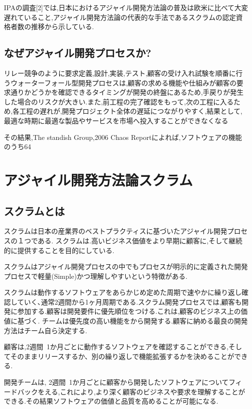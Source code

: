 \documentclass[paper]{jrsj}
\begin{document}
IPAの調査[2]では,日本におけるアジャイル開発方法論の普及は欧米に比べて大変遅れていること,アジャイル開発方法論の代表的な手法であるスクラムの認定資格者数の推移から示している.

\subsection{なぜアジャイル開発プロセスか?}
リレー競争のように要求定義,設計,実装,テスト,顧客の受け入れ試験を順番に行うウォーターフォール型開発プロセスは,顧客の求める機能や仕組みが顧客の要求通りかどうかを確認できるタイミングが開発の終盤にあるため,手戻りが発生した場合のリスクが大きい.また,前工程の完了確認をもって,次の工程に入るため,各工程の遅れが,開発プロジェクト全体の遅延につながりやすく,結果として,最適な時期に最適な製品やサービスを市場へ投入することができなくなる

その結果,The standish Group,2006 Chaos Reportによれば,ソフトウェアの機能のうち64%

\section{アジャイル開発方法論スクラム}

\subsection{スクラムとは}
スクラムは日本の産業界のベストプラクティスに基づいたアジャイル開発プロセスの１つである. 
スクラムは.高いビジネス価値をより早期に顧客に,そして継続的に提供することを目的にしている.

スクラムはアジャイル開発プロセスの中でもプロセスが明示的に定義された開発プロセスで軽量(Simple)かつ理解しやすいという特徴がある.

スクラムは動作するソフトウェアをあらかじめ定めた周期で速やかに繰り返し確認していく､通常2週間から1ヶ月周期である.スクラム開発プロセスでは,顧客も開発に参加する.顧客は開発要件に優先順位をつける.これは,顧客のビジネス上の価値に基づく. チームは優先度の高い機能をから開発する.顧客に納める最良の開発方法はチーム自ら決定する.

顧客は,2週間~1か月ごとに動作するソフトウェアを確認することができる,そしてそのままリリースするか、別の繰り返しで機能拡張するかを決めることができる.

開発チームは, 2週間~1か月ごとに顧客から開発したソフトウェアについてフィードバックをえる,これにより,より深く顧客のビジネスや要求を理解することができる.その結果ソフトウェアの価値と品質を高めることが可能になる.
\end{document}
